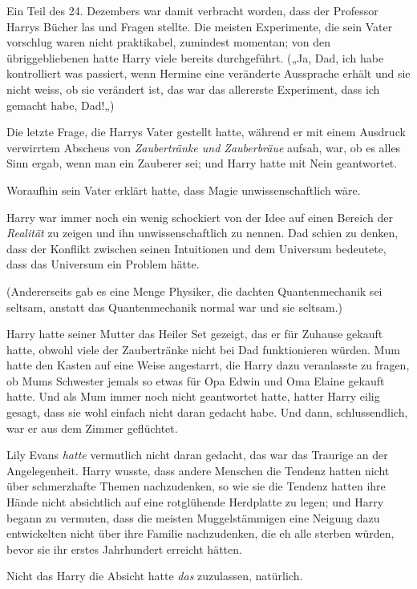 {Ein Teil des 24. Dezembers war damit verbracht worden, dass der Professor Harrys Bücher las und Fragen stellte. Die meisten Experimente, die sein Vater vorschlug waren nicht praktikabel, zumindest momentan; von den übriggebliebenen hatte Harry viele bereits durchgeführt. („Ja, Dad, ich habe kontrolliert was passiert, wenn Hermine eine veränderte Aussprache erhält und sie nicht weiss, ob sie verändert ist, das war das allererste Experiment, dass ich gemacht habe, Dad!„)

Die letzte Frage, die Harrys Vater gestellt hatte, während er mit einem Ausdruck verwirrtem Abscheus von \emph{Zaubertränke und Zauberbräue} aufsah, war, ob es alles Sinn ergab, wenn man ein Zauberer sei; und Harry hatte mit Nein geantwortet.

Woraufhin sein Vater erklärt hatte, dass Magie unwissenschaftlich wäre.

Harry war immer noch ein wenig schockiert von der Idee auf einen Bereich der \emph{Realität} zu zeigen und ihn unwissenschaftlich zu nennen. Dad schien zu denken, dass der Konflikt zwischen seinen Intuitionen und dem Universum bedeutete, dass das Universum ein Problem hätte.

(Andererseits gab es eine Menge Physiker, die dachten Quantenmechanik sei seltsam, anstatt das Quantenmechanik normal war und sie seltsam.)

Harry hatte seiner Mutter das Heiler Set gezeigt, das er für Zuhause gekauft hatte, obwohl viele der Zaubertränke nicht bei Dad funktionieren würden. Mum hatte den Kasten auf eine Weise angestarrt, die Harry dazu veranlasste zu fragen, ob Mums Schwester jemals so etwas für Opa Edwin und Oma Elaine gekauft hatte. Und als Mum immer noch nicht geantwortet hatte, hatter Harry eilig gesagt, dass sie wohl einfach nicht daran gedacht habe. Und dann, schlussendlich, war er aus dem Zimmer geflüchtet.

Lily Evans \emph{hatte} vermutlich nicht daran gedacht, das war das Traurige an der Angelegenheit. Harry wusste, dass andere Menschen die Tendenz hatten nicht über schmerzhafte Themen nachzudenken, so wie sie die Tendenz hatten ihre Hände nicht absichtlich auf eine rotglühende Herdplatte zu legen; und Harry begann zu vermuten, dass die meisten Muggelstämmigen eine Neigung dazu entwickelten nicht über ihre Familie nachzudenken, die eh alle sterben würden, bevor sie ihr erstes Jahrhundert erreicht hätten.

Nicht das Harry die Absicht hatte \emph{das} zuzulassen, natürlich.

}
